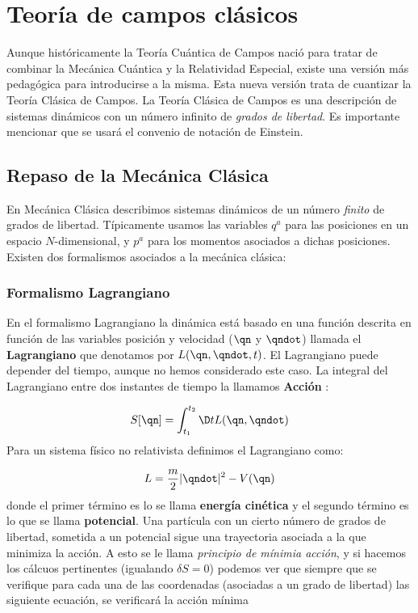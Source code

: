 
\chapter{Teoría de campos clásicos}

Aunque históricamente la Teoría Cuántica de Campos nació para tratar de combinar la Mecánica Cuántica y la Relatividad Especial, existe una versión más pedagógica para introducirse a la misma. Esta nueva versión trata de cuantizar la Teoría Clásica de Campos. La Teoría Clásica de Campos es una descripción de sistemas dinámicos con un número infinito de {\it grados de libertad}. Es importante mencionar que se usará el convenio de notación de Einstein.

\section{Repaso de la Mecánica Clásica}

En Mecánica Clásica describimos sistemas dinámicos de un número {\it finito} de grados de libertad. Típicamente usamos las variables $q^a$ para las posiciones en un espacio $N$-dimensional, y $p^a$ para los momentos asociados a dichas posiciones. Existen dos formalismos asociados a la mecánica clásica:

\subsection{Formalismo Lagrangiano}

En el formalismo Lagrangiano la dinámica está basado en una función descrita en función de las variables posición y velocidad ($\qn$ y $\qndot$) llamada el {\bf Lagrangiano} que denotamos por $L(\qn,\qndot,t)$. El Lagrangiano puede depender del tiempo, aunque no hemos considerado este caso. La integral del Lagrangiano entre dos instantes de tiempo la llamamos {\bf Acción} :

\begin{equation}
    S[\qn] = \int_{t_1}^{t_2} \D t L(\qn,\qndot)
\end{equation}
Para un sistema físico no relativista definimos el Lagrangiano como:

\begin{equation}
    L = \frac{m}{2} |\qndot|^2 - V(\qn)
\end{equation}
donde el primer término es lo se llama \textbf{energía cinética} y el segundo término es lo que se llama \textbf{potencial}. Una partícula con un cierto número de grados de libertad, sometida a un potencial sigue una trayectoria asociada a la que minimiza la acción. A esto se le llama {\it principio de mínimia acción}, y si hacemos los cálcuos pertinentes (igualando $\delta S = 0$) podemos ver que siempre que se verifique para cada una de las coordenadas (asociadas a un grado de libertad) las siguiente ecuación, se verificará la acción mínima

